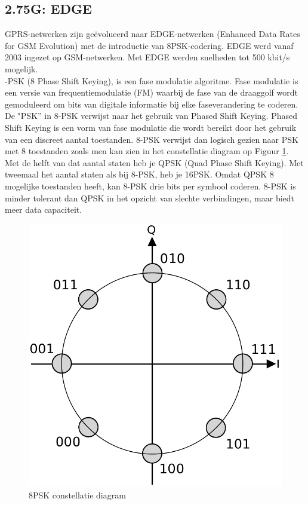 \documentclass{article}
\begin{document}
\subsection{2.75G: EDGE} \label{ssec:edge}
GPRS-netwerken zijn geëvolueerd naar EDGE-netwerken (Enhanced Data Rates for GSM Evolution) met de introductie van 8PSK-codering. EDGE werd vanaf 2003 ingezet op GSM-netwerken. Met EDGE werden snelheden tot 500 kbit/s mogelijk. \cite{2g} \\

-PSK (8 Phase Shift Keying), is een fase modulatie algoritme. Fase modulatie is een versie van frequentiemodulatie (FM) waarbij de fase van de draaggolf wordt gemoduleerd om bits van digitale informatie bij elke faseverandering te coderen.\\

\noindent De "PSK'' in 8-PSK verwijst naar het gebruik van Phased Shift Keying. Phased Shift Keying is een vorm van fase modulatie die wordt bereikt door het gebruik van een discreet aantal toestanden. 8-PSK verwijst dan logisch gezien naar PSK met 8 toestanden zoals men kan zien in het constellatie diagram op Figuur \ref{fig:8PSK}. Met de helft van dat aantal staten heb je QPSK (Quad Phase Shift Keying). Met tweemaal het aantal staten als bij 8-PSK, heb je 16PSK. Omdat QPSK 8 mogelijke toestanden heeft, kan 8-PSK drie bits per symbool coderen. 8-PSK is minder tolerant dan QPSK in het opzicht van slechte verbindingen, maar biedt meer data capaciteit. \cite{psk}


\begin{figure}[H]
\centering
\includegraphics[width=0.75 \textwidth]{img/8PSK.png}
\caption{8PSK constellatie diagram}
\label{fig:8PSK}
\end{figure}
\end{document}
